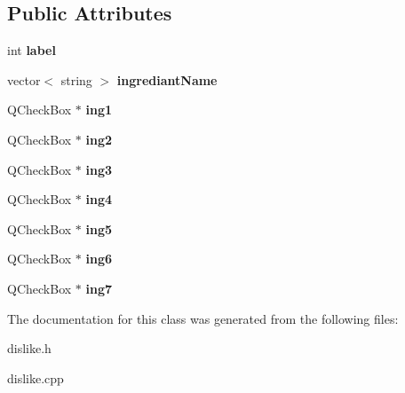 \subsection*{Public Attributes}
\begin{DoxyCompactItemize}
\item 
int {\bfseries label}\hypertarget{class_dislike_ace5f2fced7fd0b95f322b559af593e99}{}\label{class_dislike_ace5f2fced7fd0b95f322b559af593e99}

\item 
vector$<$ string $>$ {\bfseries ingrediant\+Name}\hypertarget{class_dislike_a2a048ed8ce4e8f050ab229176db58ede}{}\label{class_dislike_a2a048ed8ce4e8f050ab229176db58ede}

\item 
Q\+Check\+Box $\ast$ {\bfseries ing1}\hypertarget{class_dislike_a9a099b3b47a7aa0185348905c49e7eca}{}\label{class_dislike_a9a099b3b47a7aa0185348905c49e7eca}

\item 
Q\+Check\+Box $\ast$ {\bfseries ing2}\hypertarget{class_dislike_a94f61966eedb4ff8d76c90684ea90301}{}\label{class_dislike_a94f61966eedb4ff8d76c90684ea90301}

\item 
Q\+Check\+Box $\ast$ {\bfseries ing3}\hypertarget{class_dislike_aebbb72fcabbd7ca5bc7643b10caf6116}{}\label{class_dislike_aebbb72fcabbd7ca5bc7643b10caf6116}

\item 
Q\+Check\+Box $\ast$ {\bfseries ing4}\hypertarget{class_dislike_a7cc62e686e88d6e1ff9506ed71935b5f}{}\label{class_dislike_a7cc62e686e88d6e1ff9506ed71935b5f}

\item 
Q\+Check\+Box $\ast$ {\bfseries ing5}\hypertarget{class_dislike_afb9c817bcaaa0653cde97568d23497e7}{}\label{class_dislike_afb9c817bcaaa0653cde97568d23497e7}

\item 
Q\+Check\+Box $\ast$ {\bfseries ing6}\hypertarget{class_dislike_a958fddb5800a54a01a9641e776caef9a}{}\label{class_dislike_a958fddb5800a54a01a9641e776caef9a}

\item 
Q\+Check\+Box $\ast$ {\bfseries ing7}\hypertarget{class_dislike_a4aecfa5c8d8b318225481512edd63c97}{}\label{class_dislike_a4aecfa5c8d8b318225481512edd63c97}

\end{DoxyCompactItemize}


The documentation for this class was generated from the following files\+:\begin{DoxyCompactItemize}
\item 
dislike.\+h\item 
dislike.\+cpp\end{DoxyCompactItemize}
